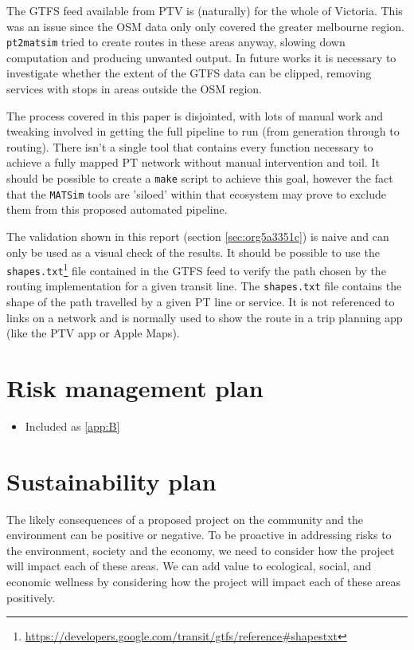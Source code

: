 \documentclass[11pt]{article}
\begin{document}
The GTFS feed available from PTV is (naturally) for the whole of Victoria. This was an issue since the OSM data only only covered the greater melbourne region. \texttt{pt2matsim} tried to create routes in these areas anyway, slowing down computation and producing unwanted output. In future works it is necessary to investigate whether the extent of the GTFS data can be clipped, removing services with stops in areas outside the OSM region.

The process covered in this paper is disjointed, with lots of manual work and tweaking involved in getting the full pipeline to run (from generation through to routing). There isn't a single tool that contains every function necessary to achieve a fully mapped PT network without manual intervention and toil. It should be possible to create a \texttt{make} script to achieve this goal, however the fact that the \texttt{MATSim} tools are 'siloed' within that ecosystem may prove to exclude them from this proposed automated pipeline.

The validation shown in this report (section \ref{sec:org5a3351c}) is naive and can only be used as a visual check of the results. It should be possible to use the \texttt{shapes.txt}\footnote{\url{https://developers.google.com/transit/gtfs/reference\#shapestxt}} file contained in the GTFS feed to verify the path chosen by the routing implementation for a given transit line. The \texttt{shapes.txt} file contains the shape of the path travelled by a given PT line or service. It is not referenced to links on a network and is normally used to show the route in a trip planning app (like the PTV app or Apple Maps).
\section{Risk management plan}
\label{sec:orgbfb7888}
\begin{itemize}
\item Included as \cref{app:B}
\end{itemize}
\section{Sustainability plan}
\label{sec:orgf16f6b4}
The likely consequences of a proposed project on the community and the environment can be positive or negative. To be proactive in addressing risks to the environment, society and the economy, we need to consider how the project will impact each of these areas. We can add value to ecological, social, and economic wellness by considering how the project will impact each of these areas positively.
\end{document}
